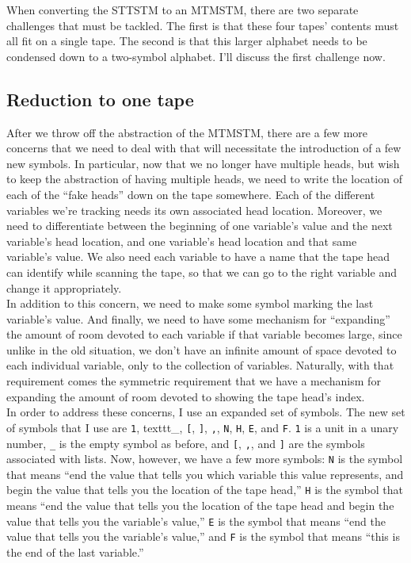 \documentclass{article}
\begin{document}
When converting the STTSTM to an MTMSTM, there are two separate challenges that must be tackled. The first is that these four tapes' contents must all fit on a single tape. The second is that this larger alphabet needs to be condensed down to a two-symbol alphabet. I'll discuss the first challenge now.

\subsection{Reduction to one tape}

After we throw off the abstraction of the MTMSTM, there are a few more concerns that we need to deal with that will necessitate the introduction of a few new symbols. In particular, now that we no longer have multiple heads, but wish to keep the abstraction of having multiple heads, we need to write the location of each of the ``fake heads'' down on the tape somewhere. Each of the different variables we're tracking needs its own associated head location. Moreover, we need to differentiate between the beginning of one variable's value and the next variable's head location, and one variable's head location and that same variable's value. We also need each variable to have a name that the tape head can identify while scanning the tape, so that we can go to the right variable and change it appropriately.  \\

In addition to this concern, we need to make some symbol marking the last variable's value. And finally, we need to have some mechanism for ``expanding'' the amount of room devoted to each variable if that variable becomes large, since unlike in the old situation, we don't have an infinite amount of space devoted to each individual variable, only to the collection of variables. Naturally, with that requirement comes the symmetric requirement that we have a mechanism for expanding the amount of room devoted to showing the tape head's index.\\

In order to address these concerns, I use an expanded set of symbols. The new set of symbols that I use are \texttt{1}, texttt{\_}, \texttt{[}, \texttt{]}, \texttt{,}, \texttt{N}, \texttt{H}, \texttt{E}, and \texttt{F}. \texttt{1} is a unit in a unary number, \texttt{\_} is the empty symbol as before, and \texttt{[}, \texttt{,}, and \texttt{]} are the symbols associated with lists. Now, however, we have a few more symbols: \texttt{N} is the symbol that means ``end the value that tells you which variable this value represents, and begin the value that tells you the location of the tape head,'' \texttt{H} is the symbol that means ``end the value that tells you the location of the tape head and begin the value that tells you the variable's value,'' \texttt{E} is the symbol that means ``end the value that tells you the variable's value,'' and \texttt{F} is the symbol that means ``this is the end of the last variable.'' \\
\end{document}
